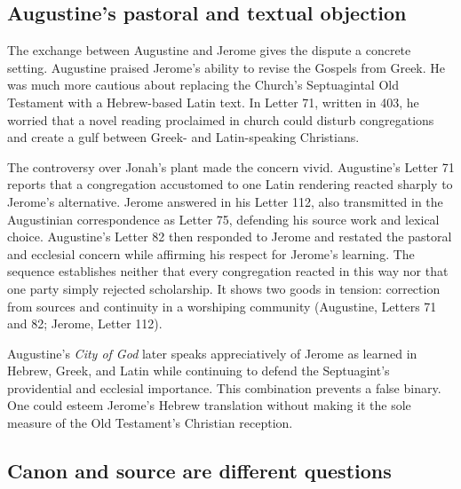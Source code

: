 \subsection{Augustine's pastoral and textual objection}

The exchange between Augustine and Jerome gives the dispute a concrete setting. Augustine praised Jerome's ability to revise the Gospels from Greek. He was much more cautious about replacing the Church's Septuagintal Old Testament with a Hebrew-based Latin text. In Letter 71, written in 403, he worried that a novel reading proclaimed in church could disturb congregations and create a gulf between Greek- and Latin-speaking Christians.

The controversy over Jonah's plant made the concern vivid. Augustine's Letter 71 reports that a congregation accustomed to one Latin rendering reacted sharply to Jerome's alternative. Jerome answered in his Letter 112, also transmitted in the Augustinian correspondence as Letter 75, defending his source work and lexical choice. Augustine's Letter 82 then responded to Jerome and restated the pastoral and ecclesial concern while affirming his respect for Jerome's learning. The sequence establishes neither that every congregation reacted in this way nor that one party simply rejected scholarship. It shows two goods in tension: correction from sources and continuity in a worshiping community (Augustine, Letters 71 and 82; Jerome, Letter 112).

Augustine's \emph{City of God} later speaks appreciatively of Jerome as learned in Hebrew, Greek, and Latin while continuing to defend the Septuagint's providential and ecclesial importance. This combination prevents a false binary. One could esteem Jerome's Hebrew translation without making it the sole measure of the Old Testament's Christian reception.


\subsection{Canon and source are different questions}

